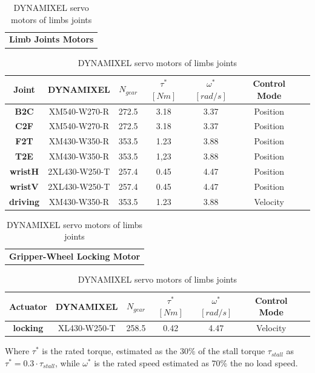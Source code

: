 \begin{table}[H]
\centering 
    \caption{DYNAMIXEL servo motors of limbs joints}
    \label{table:DYNAMIXEL}
    \begin{tabular}{ c }
    \textbf{Limb Joints Motors}
    \end{tabular}
    \begin{tabular}{| c | c | c | c | c | c | c|}
    \hline
    \rowcolor{bluepoli!40}
     \textbf{Joint} &  DYNAMIXEL & $N_{gear}$ & \textbf{$\tau^*$} $[N m]$ & {$\omega^*$}  $[rad/s]$ & Control Mode \T\B \\
    \hline \hline
    \textbf{B2C} & XM540-W270-R & 272.5 & 3.18 & 3.37  & Position  \T\B\\
    \hline 
    \textbf{C2F} & XM540-W270-R & 272.5 & 3.18 & 3.37 & Position  \T\B\\
    \hline
    \textbf{F2T} & XM430-W350-R & 	353.5  & 1.23 & 3.88 & Position \T\B\\
    \hline
    \textbf{T2E} & XM430-W350-R & 	353.5 & 1,23 & 3.88 & Position \B\\
    \hline
    \textbf{wristH} & 2XL430-W250-T & 257.4 &  0.45 & 4.47 & Position \B\\
    \hline
    \textbf{wristV} & 2XL430-W250-T  & 257.4 &  0.45 & 4.47 & Position \B\\
    \hline
    \textbf{driving} & XM430-W350-R  & 353.5 &  1.23 & 3.88  & Velocity  \B\\
    \hline
    \end{tabular}
    \begin{tabular}{ c }
    \\
    \textbf{Gripper-Wheel Locking Motor}
    \end{tabular}
    \begin{tabular}{| c | c | c | c | c | c | c|}
    \hline
    \rowcolor{bluepoli!40}
    \textbf{Actuator} &  DYNAMIXEL & $N_{gear}$ & \textbf{$\tau^*$} $[N m]$ & {$\omega^*$}  $[rad/s]$ & Control Mode \T\B \\
    \hline\hline
    \textbf{locking} & XL430-W250-T & 258.5 &  0.42 & 4.47 & Velocity \B\\
    \hline
    \end{tabular}
\end{table}

Where $\tau^*$ is the rated torque, estimated as the $ 30\% $ of the stall torque $\tau_{stall}$ as $\tau^* = 0.3\cdot\tau_{stall}$, while $\omega^*$ is the rated speed estimated as $70\%$ the no load speed.
  
